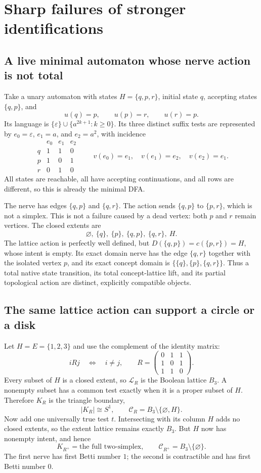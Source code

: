 \documentclass[11pt]{article}
\theoremstyle{remark}
\begin{document}
\section{Sharp failures of stronger identifications}
\subsection{A live minimal automaton whose nerve action is not total}

Take a unary automaton with states $H=\{q,p,r\}$, initial state $q$,
accepting states $\{q,p\}$, and
\[
 u(q)=p,\qquad u(p)=r,\qquad u(r)=p.
\]
Its language is $\{\varepsilon\}\cup\{a^{2k+1}:k\geq0\}$.
Its three distinct suffix tests are represented by
$e_0=\varepsilon$, $e_1=a$, and $e_2=a^2$, with incidence
\[
 \begin{array}{c|ccc}
       &e_0&e_1&e_2\\\hline
 q&1&1&0\\
 p&1&0&1\\
 r&0&1&0
 \end{array}
 \qquad
 v(e_0)=e_1,\quad v(e_1)=e_2,\quad v(e_2)=e_1.
\]
All states are reachable, all have accepting continuations, and all rows
are different, so this is already the minimal DFA.

The nerve has edges $\{q,p\}$ and $\{q,r\}$. The action sends
$\{q,p\}$ to $\{p,r\}$, which is not a simplex. This is not a failure
caused by a dead vertex: both $p$ and $r$ remain vertices.
The closed extents are
\[
 \varnothing,\ \{q\},\ \{p\},\ \{q,p\},\ \{q,r\},\ H.
\]
The lattice action is perfectly well defined, but
$D(\{q,p\})=c(\{p,r\})=H$, whose intent is empty.
Its exact domain nerve has the edge $\{q,r\}$ together with the isolated
vertex $p$, and its exact concept domain is
$\{\{q\},\{p\},\{q,r\}\}$.
Thus a total native state transition, its total concept-lattice lift,
and its partial topological action are distinct, explicitly compatible
objects.

\subsection{The same lattice action can support a circle or a disk}

Let $H=E=\{1,2,3\}$ and use the complement of the identity matrix:
\[
 iRj\quad\Longleftrightarrow\quad i\ne j,
 \qquad
 R=\begin{pmatrix}0&1&1\\1&0&1\\1&1&0\end{pmatrix}.
\]
Every subset of $H$ is a closed extent, so $\mathcal L_R$ is the Boolean
lattice $B_3$. A nonempty subset has a common test exactly when it is a
proper subset of $H$. Therefore $K_R$ is the triangle boundary,
\[
 |K_R|\cong S^1,
 \qquad \mathcal C_R=B_3\setminus\{\varnothing,H\}.
\]
Now add one universally true test $t$. Intersecting with its column $H$
adds no closed extents, so the extent lattice remains exactly $B_3$.
But $H$ now has nonempty intent, and hence
\[
 K_{R^+}=\text{the full two-simplex},\qquad
 \mathcal C_{R^+}=B_3\setminus\{\varnothing\}.
\]
The first nerve has first Betti number $1$; the second is contractible
and has first Betti number $0$.
\end{document}
